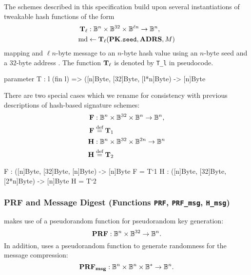    The schemes described in this specification build upon several instantiations
   of tweakable hash functions of the form
   \begin{align*}
     \mathbf{T}_\ell &: \mathbb{B}^n \times \mathbb{B}^{32} \times \mathbb{B}^{\ell n} \to \mathbb{B}^n, \\
     \textrm{md} &\leftarrow \mathbf{T}_\ell(\mathbf{PK}.\texttt{seed}, \textbf{ADRS}, M)
   \end{align*}
   mapping and $\ell n$-byte message \msg to an
   $n$-byte hash value \md using an $n$-byte seed \pseed and a $32$-byte address \adrs.
   The function $\mathbf{T}_\ell$ is denoted by \texttt{T\_l} in pseudocode.

\begin{code}
  parameter
    T : {l} (fin l) => ([n]Byte, [32]Byte, [l*n]Byte) -> [n]Byte
\end{code}

   There are two special cases which we rename for consistency with previous
   descriptions of hash-based signature schemes:
   \begin{align*}
     \mathbf{F} &: \mathbb{B}^n \times \mathbb{B}^{32} \times \mathbb{B}^n \to \mathbb{B}^n, \\
     \mathbf{F} &\stackrel{\text{def}}{=} \mathbf{T}_1\\
     \mathbf{H} &: \mathbb{B}^n \times \mathbb{B}^{32} \times \mathbb{B}^{2n} \to \mathbb{B}^n \\
     \mathbf{H} &\stackrel{\text{def}}{=} \mathbf{T}_2\\
   \end{align*}

\begin{code}
  F : ([n]Byte, [32]Byte, [n]Byte) -> [n]Byte
  F = T`{1}
  H : ([n]Byte, [32]Byte, [2*n]Byte) -> [n]Byte
  H = T`{2}
\end{code}


\subsubsection{PRF and Message Digest (Functions \texttt{PRF}, \texttt{PRF\_msg}, \texttt{H\_msg})}
   \spx makes use of a pseudorandom function \sphincsPRF for pseudorandom key
   generation:
   \begin{equation*}
      \mathbf{PRF}: \mathbb{B}^n \times \mathbb{B}^{32} \to \mathbb{B}^n.
   \end{equation*}
   In addition, \spx uses a pseudorandom function \sphincsPRFmsg to generate
   randomness for the message compression:
   \begin{equation*}
      \mathbf{PRF_{msg}}: \mathbb{B}^n \times \mathbb{B}^n \times \mathbb{B}^* \to \mathbb{B}^n.
   \end{equation*}

